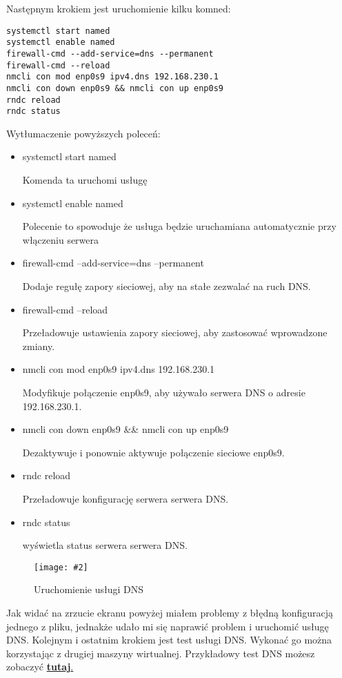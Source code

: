 \documentclass[a4paper]{article}
\newcommand*{\zdj}[2][\textwidth]{\texttt{[image: \#2]}}
\newcommand*{\fg}[4][!htb]{
      \begin{figure*}[#1]
            \zdj{#2}
            \caption[#4]{#3}
      \end{figure*}
}
\begin{document}
Następnym krokiem jest uruchomienie kilku komned:
\begin{Verbatim}[frame=single]
systemctl start named 
systemctl enable named
firewall-cmd --add-service=dns --permanent 
firewall-cmd --reload
nmcli con mod enp0s9 ipv4.dns 192.168.230.1
nmcli con down enp0s9 && nmcli con up enp0s9
rndc reload 
rndc status
\end{Verbatim}

Wytłumaczenie powyższych poleceń:
\begin{itemize}
      \item systemctl start named
      
      Komenda ta uruchomi usługę 
      \item systemctl enable named
      
Polecenie to spowoduje że usługa będzie uruchamiana automatycznie przy włączeniu serwera 
\item firewall-cmd --add-service=dns --permanent 

Dodaje regułę zapory sieciowej, aby na stałe zezwalać na ruch DNS.
\item firewall-cmd --reload

Przeładowuje ustawienia zapory sieciowej, aby zastosować wprowadzone zmiany.
\item nmcli con mod enp0s9 ipv4.dns 192.168.230.1

Modyfikuje połączenie enp0s9, aby używało serwera DNS o adresie 192.168.230.1.
\item nmcli con down enp0s9 \&\& nmcli con up enp0s9

Dezaktywuje i ponownie aktywuje połączenie sieciowe enp0s9.
\item rndc reload 

Przeładowuje konfigurację serwera serwera DNS.
\item rndc status

wyświetla status serwera serwera DNS.
\end{itemize}

\fg{contents/configuration/DNS/7.png}{Uruchomienie usługi DNS}{Uruchomienie usługi DNS}

Jak widać na zrzucie ekranu powyżej miałem problemy z błędną konfiguracją jednego z pliku, jednakże udało mi się naprawić problem i uruchomić usługę DNS.
Kolejnym i ostatnim krokiem jest test usługi DNS. Wykonać go można korzystając z drugiej maszyny wirtualnej. Przykładowy test DNS możesz zobaczyć
\hyperref[fig:dns-test]{\textbf{tutaj}.}

\vspace*{-5pt}
\end{document}
